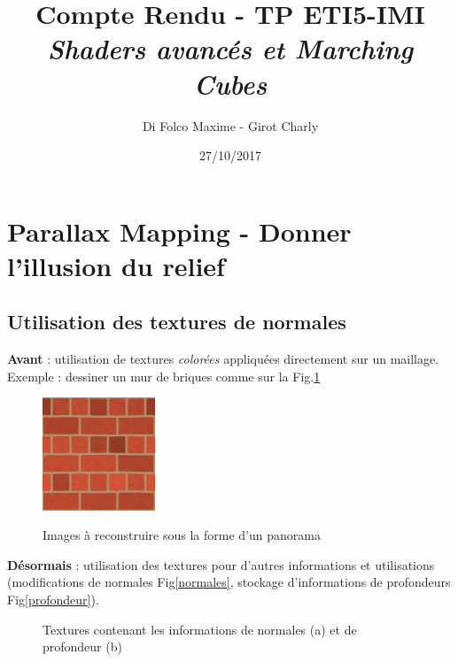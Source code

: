\documentclass[a4paper]{article}
\title{Compte Rendu - TP ETI5-IMI \\ \textit{Shaders avancés et Marching Cubes}}
\author{Di Folco Maxime - Girot Charly}
\date{27/10/2017}
\begin{document}
\maketitle


\section{Parallax Mapping - Donner l'illusion du relief}
\subsection{Utilisation des textures de normales}
\textbf{Avant} : utilisation de textures \textit{colorées} appliquées directement sur un maillage. Exemple : dessiner un mur de briques comme sur la Fig.\ref{briques}

\begin{figure}[H]
\centering
\includegraphics[width=0.3\textwidth]{figures/brick_diffuse.png}\label{briques}
\caption{Images à reconstruire sous la forme d'un panorama}
\end{figure}


\textbf{Désormais} : utilisation des textures pour d'autres informations et utilisations (modifications de normales Fig\ref{normales}, stockage d'informations de profondeurs Fig\ref{profondeur}). 

\begin{figure}[H]
\centering
{}
\caption{Textures contenant les informations de normales (a) et de profondeur (b)}
\end{figure}
\end{document}
